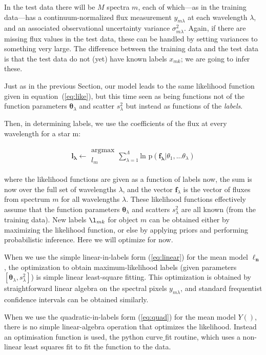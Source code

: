 \documentclass[12pt, preprint]{aastex}
\newcommand{\sectionname}{Section}
\newcommand{\set}[1]{\bm{#1}}
\begin{document}
In the test data there will be $M$ spectra $m$, each of which---as in
the training data---has a continuum-normalized flux measurement
$y_{m\lambda}$ at each wavelength $\lambda$, and an
associated observational uncertainty variance $\sigma_{m\lambda}^2$.
Again, if there are missing flux values in the test data, these can be
handled by setting variances to something very large.
The difference between the training data and the test data is that the
test data do not (yet) have known labels $x_{mk}$; we are going to infer
these.

Just as in the previous \sectionname, our model leads to the same likelihood function given in
equation~(\ref{eq:like}), but this time seen as
being functions not of the function parameters $\set{\theta}_\lambda$ and
scatter $s_\lambda^2$ but instead as functions of the \emph{labels}.

Then, in determining labels, we use the coefficients of the flux at every wavelength for a star m: 

\begin{eqnarray}
\set{l_\lambda} \leftarrow \substack{\mbox{argmax}\\
{l_m}  }
\sum_{\lambda=1}^\Lambda \mbox{ln p}(\set{f_\lambda} | {\theta_1,...\theta_\lambda})
\end{eqnarray}

where the likelihood functions are given as a function of labels now,
the sum is now over the full set of wavelengths
$\lambda$, and the vector $\set{f}_\lambda$ is the vector of fluxes from
spectrum $m$ for all wavelengths $\lambda$.
These likelihood functions effectively assume that the function
parameters $\set{\theta}_\lambda$ and scatters $s_\lambda^2$ are all known (from
the training data).
New labels $\l_{mk}$ for object $m$ can be obtained either by maximizing
the likelihood function, or else by applying priors
and performing probabilistic inference.
Here we will optimize for now.

When we use the simple linear-in-labels form (\ref{eq:linear}) for the
mean model $\set{\ell_n}$, the optimization to obtain maximum-likelihood labels
(given parameters $[\set{\theta}_\lambda, s_\lambda^2]$) is simple linear
least-square fitting.
This optimization is obtained by straightforward linear algebra on the
spectral pixels $y_{m\lambda}$, and standard frequentist confidence
intervals can be obtained similarly.

When we use the quadratic-in-labels form (\ref{eq:quad}) for the
mean model $Y()$, there is no simple linear-algebra operation that
optimizes the likelihood. Instead an optimisation function is used, the python curve$\_$fit routine, which uses a non-linear least squares fit to fit the function to the data. 
\end{document}
